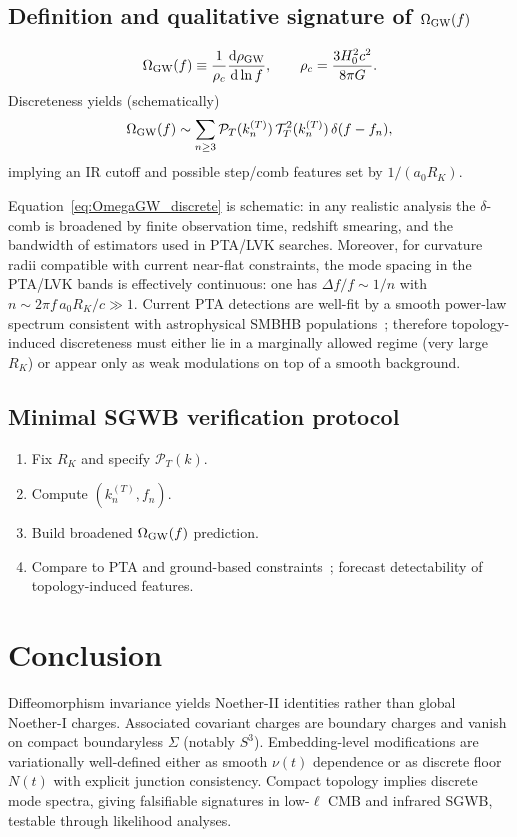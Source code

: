 \documentclass[
  reprint,
  amsmath,amssymb,
  aps,
  prd,
  superscriptaddress,
  nofootinbib,
  longbibliography
]{revtex4-2}
\newcommand{\Sthree}{S^{3}}
\newcommand{\Sig}{\Sigma}
\theoremstyle{definition}
\theoremstyle{remark}
\begin{document}
\subsection{\texorpdfstring{Definition and qualitative signature of $\Omega_{\rm GW}(f)$}{Definition and qualitative signature of OmegaGW(f)}}
\begin{equation}
\Omega_{\rm GW}(f)\equiv \frac{1}{\rho_c}\frac{\dd\rho_{\rm GW}}{\dd\ln f},
\qquad \rho_c=\frac{3H_0^2c^2}{8\pi G}.
\label{eq:OmegaGW_def}
\end{equation}
Discreteness yields (schematically)
\begin{equation}
\Omega_{\rm GW}(f)\sim \sum_{n\ge 3}\mathcal P_T(k^{(T)}_n)\,\mathcal T_T^2(k^{(T)}_n)\,\delta(f-f_n),
\label{eq:OmegaGW_discrete}
\end{equation}
implying an IR cutoff and possible step/comb features set by $1/(a_0R_K)$.

Equation~\eqref{eq:OmegaGW_discrete} is schematic: in any realistic analysis the \(\delta\)-comb is broadened
by finite observation time, redshift smearing, and the bandwidth of estimators used in PTA/LVK searches.
Moreover, for curvature radii compatible with current near-flat constraints, the mode spacing in the PTA/LVK bands is
effectively continuous: one has $\Delta f/f\sim 1/n$ with $n\sim 2\pi f\,a_0R_K/c\gg 1$.
Current PTA detections are well-fit by a smooth power-law spectrum consistent with astrophysical SMBHB
populations~\cite{NANOGrav15yr2023,IPTADR2_2022}; therefore topology-induced discreteness must either lie in a
marginally allowed regime (very large \(R_K\)) or appear only as weak modulations on top of a smooth background.


\subsection{Minimal SGWB verification protocol}
\begin{enumerate}
\item Fix $R_K$ and specify $\mathcal P_T(k)$.
\item Compute $(k^{(T)}_n,f_n)$.
\item Build broadened $\Omega_{\rm GW}(f)$ prediction.
\item Compare to PTA and ground-based constraints~\cite{NANOGrav15yr2023,IPTADR2_2022,LVK2021ISGWB}; forecast detectability of topology-induced features.
\end{enumerate}

\section{Conclusion}
Diffeomorphism invariance yields Noether-II identities rather than global Noether-I charges. Associated covariant
charges are boundary charges and vanish on compact boundaryless $\Sig$ (notably $\Sthree$). Embedding-level
modifications are variationally well-defined either as smooth $\nu(t)$ dependence or as discrete floor $N(t)$ with
explicit junction consistency. Compact topology implies discrete mode spectra, giving falsifiable signatures in low-$\ell$
CMB and infrared SGWB, testable through likelihood analyses.
\end{document}
